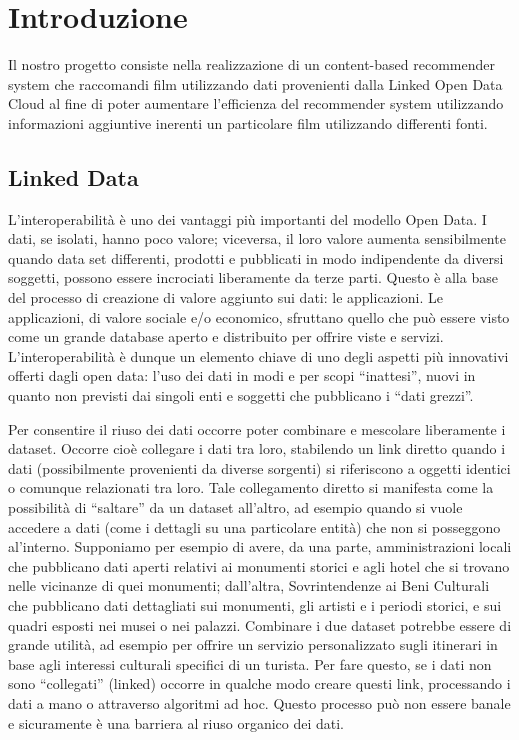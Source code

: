 \section{Introduzione}

Il nostro progetto consiste nella realizzazione di un content-based recommender system che raccomandi film utilizzando dati provenienti dalla Linked Open Data Cloud al fine di poter aumentare l'efficienza del recommender system utilizzando informazioni aggiuntive inerenti un particolare film utilizzando differenti fonti.

\subsection{Linked Data}
L’interoperabilità è uno dei vantaggi più importanti del modello Open Data. I dati, se isolati, hanno poco valore; viceversa, il loro valore aumenta sensibilmente quando data set differenti, prodotti e pubblicati in modo indipendente da diversi soggetti, possono essere incrociati liberamente da terze parti. Questo è alla base del processo di creazione di valore aggiunto sui dati: le applicazioni. Le applicazioni, di valore sociale e/o economico, sfruttano quello che può essere visto come un grande database aperto e distribuito per offrire viste e servizi. L’interoperabilità è dunque un elemento chiave di uno degli aspetti più innovativi offerti dagli open data: l’uso dei dati in modi e per scopi “inattesi”, nuovi in quanto non previsti dai singoli enti e soggetti che pubblicano i “dati grezzi”.

Per consentire il riuso dei dati occorre poter combinare e mescolare liberamente i dataset. Occorre cioè collegare i dati tra loro, stabilendo un link diretto quando i dati (possibilmente provenienti da diverse sorgenti) si riferiscono a oggetti identici o comunque relazionati tra loro. Tale collegamento diretto si manifesta come la possibilità di “saltare” da un dataset all’altro, ad esempio quando si vuole accedere a dati (come i dettagli su una particolare entità) che non si posseggono al’interno.
Supponiamo per esempio di avere, da una parte, amministrazioni locali che pubblicano dati aperti relativi ai monumenti storici e agli hotel che si trovano nelle vicinanze di quei monumenti; dall’altra, Sovrintendenze ai Beni Culturali che pubblicano dati dettagliati sui monumenti, gli artisti e i periodi storici, e sui quadri esposti nei musei o nei palazzi.
Combinare i due dataset potrebbe essere di grande utilità, ad esempio per offrire un servizio personalizzato sugli itinerari in base agli interessi culturali specifici di un turista.
Per fare questo, se i dati non sono “collegati” (linked) occorre in qualche modo creare questi link, processando i dati a mano o attraverso algoritmi ad hoc. Questo processo può non essere banale e sicuramente è una barriera al riuso organico dei dati.


